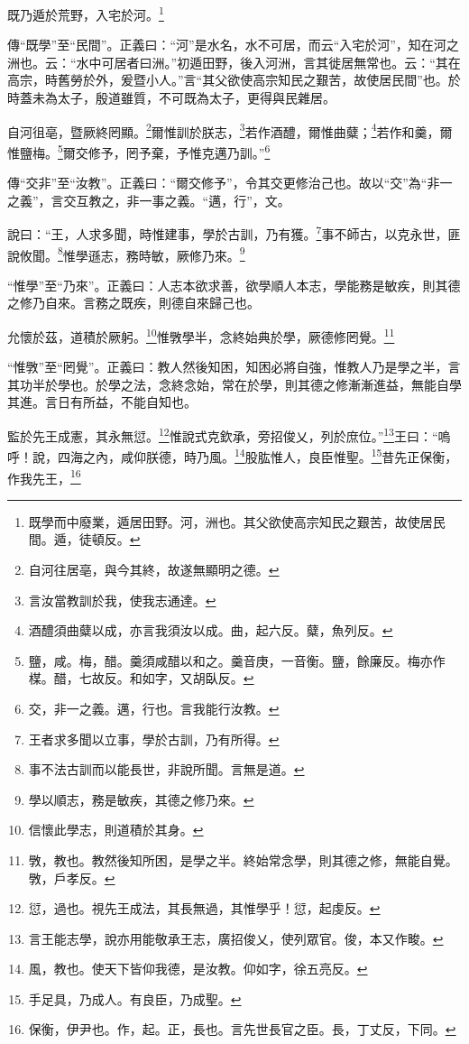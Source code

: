 既乃遁於荒野，入宅於河。\footnote{既學而中廢業，遁居田野。河，洲也。其父欲使高宗知民之艱苦，故使居民間。遁，徒頓反。}

{\noindent\zhuan{}\fzbyks 傳“既學”至“民間”。正義曰：“河”是水名，水不可居，而云“入宅於河”，知在河之洲也。云：“水中可居者曰洲。”初遁田野，後入河洲，言其徙居無常也。云：“其在高宗，時舊勞於外，爰暨小人。”言“其父欲使高宗知民之艱苦，故使居民間”也。於時蓋未為太子，殷道雖質，不可既為太子，更得與民雜居。 \par}

自河徂亳，暨厥終罔顯。\footnote{自河往居亳，與今其終，故遂無顯明之德。}爾惟訓於朕志，\footnote{言汝當教訓於我，使我志通達。}若作酒醴，爾惟曲糵；\footnote{酒醴須曲糵以成，亦言我須汝以成。曲，起六反。糵，魚列反。}若作和羹，爾惟鹽梅。\footnote{鹽，咸。梅，醋。羹須咸醋以和之。羹音庚，一音衡。鹽，餘廉反。梅亦作楳。醋，七故反。和如字，又胡臥反。}爾交修予，罔予棄，予惟克邁乃訓。”\footnote{交，非一之義。邁，行也。言我能行汝教。}

{\noindent\zhuan{}\fzbyks 傳“交非”至“汝教”。正義曰：“爾交修予”，令其交更修治己也。故以“交”為“非一之義”，言交互教之，非一事之義。“邁，行”，文。 \par}

說曰：“王，人求多聞，時惟建事，學於古訓，乃有獲。\footnote{王者求多聞以立事，學於古訓，乃有所得。}事不師古，以克永世，匪說攸聞。\footnote{事不法古訓而以能長世，非說所聞。言無是道。}惟學遜志，務時敏，厥修乃來。\footnote{學以順志，務是敏疾，其德之修乃來。}

{\noindent\shu{}\fzkt “惟學”至“乃來”。正義曰：人志本欲求善，欲學順人本志，學能務是敏疾，則其德之修乃自來。言務之既疾，則德自來歸己也。 \par}

允懷於茲，道積於厥躬。\footnote{信懷此學志，則道積於其身。}惟斆學半，念終始典於學，厥德修罔覺。\footnote{斆，教也。教然後知所困，是學之半。終始常念學，則其德之修，無能自覺。斆，戶孝反。}

{\noindent\shu{}\fzkt “惟斆”至“罔覺”。正義曰：教人然後知困，知困必將自強，惟教人乃是學之半，言其功半於學也。於學之法，念終念始，常在於學，則其德之修漸漸進益，無能自學其進。言日有所益，不能自知也。 \par}

監於先王成憲，其永無愆。\footnote{愆，過也。視先王成法，其長無過，其惟學乎！愆，起虔反。}惟說式克欽承，旁招俊乂，列於庶位。”\footnote{言王能志學，說亦用能敬承王志，廣招俊乂，使列眾官。俊，本又作畯。}王曰：“嗚呼！說，四海之內，咸仰朕德，時乃風。\footnote{風，教也。使天下皆仰我德，是汝教。仰如字，徐五亮反。}股肱惟人，良臣惟聖。\footnote{手足具，乃成人。有良臣，乃成聖。}昔先正保衡，作我先王，\footnote{保衡，伊尹也。作，起。正，長也。言先世長官之臣。長，丁丈反，下同。}

